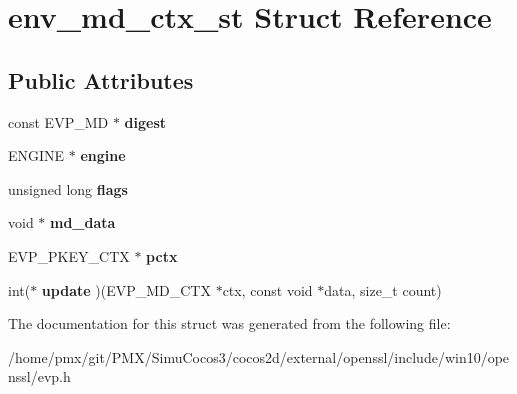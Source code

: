 \hypertarget{structenv__md__ctx__st}{}\section{env\+\_\+md\+\_\+ctx\+\_\+st Struct Reference}
\label{structenv__md__ctx__st}
\subsection*{Public Attributes}
\begin{DoxyCompactItemize}
\item 
\mbox{\label{structenv__md__ctx__st_a5cd23227051f7f605039f24f105f0dea}} 
const E\+V\+P\+\_\+\+MD $\ast$ {\bfseries digest}
\item 
\mbox{\label{structenv__md__ctx__st_aa74b6022586da8be425ea8eb897a8130}} 
E\+N\+G\+I\+NE $\ast$ {\bfseries engine}
\item 
\mbox{\label{structenv__md__ctx__st_aae521b439879e6584b766d7703741d43}} 
unsigned long {\bfseries flags}
\item 
\mbox{\label{structenv__md__ctx__st_a9e1598967116d321673826a7909e7efa}} 
void $\ast$ {\bfseries md\+\_\+data}
\item 
\mbox{\label{structenv__md__ctx__st_aaf0d8bf6f34617159fd263074a07a555}} 
E\+V\+P\+\_\+\+P\+K\+E\+Y\+\_\+\+C\+TX $\ast$ {\bfseries pctx}
\item 
\mbox{\label{structenv__md__ctx__st_a55517be3f51260fe504e146b9b651d60}} 
int($\ast$ {\bfseries update} )(E\+V\+P\+\_\+\+M\+D\+\_\+\+C\+TX $\ast$ctx, const void $\ast$data, size\+\_\+t count)
\end{DoxyCompactItemize}


The documentation for this struct was generated from the following file\+:\begin{DoxyCompactItemize}
\item 
/home/pmx/git/\+P\+M\+X/\+Simu\+Cocos3/cocos2d/external/openssl/include/win10/openssl/evp.\+h\end{DoxyCompactItemize}
